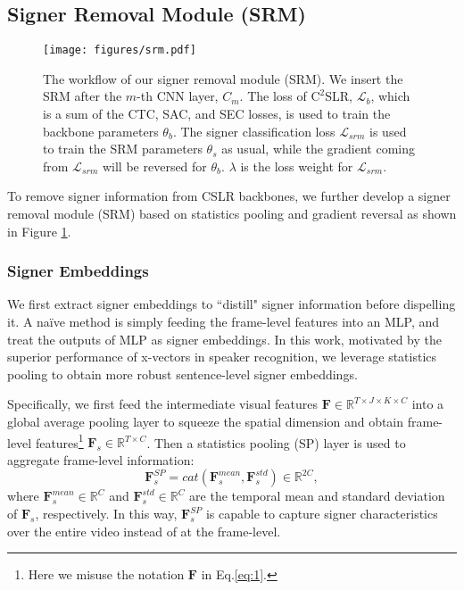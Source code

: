 \documentclass[acmsmall,screen]{acmart}
\def \mbf{\mathbf}
\def \mbb{\mathbb}
\begin{document}
\subsection{Signer Removal Module (SRM)}
\begin{figure}[t]
  \centering
  \texttt{[image: figures/srm.pdf]}
  \caption{The workflow of our signer removal module (SRM). We insert the SRM after the $m$-th CNN layer, $C_m$. The loss of $\text{C}^2$SLR, $\mathcal{L}_b$, which is a sum of the CTC, SAC, and SEC losses, is used to train the backbone parameters $\theta_b$. The signer classification loss $\mathcal{L}_{srm}$ is used to train the SRM parameters $\theta_s$ as usual, while the gradient coming from $\mathcal{L}_{srm}$ will be reversed for $\theta_b$. $\lambda$ is the loss weight for $\mathcal{L}_{srm}$.}
  \label{fig:srm}
\end{figure}
To remove signer information from CSLR backbones, we further develop a signer removal module (SRM) based on statistics pooling and gradient reversal as shown in Figure \ref{fig:srm}. 

\subsubsection{Signer Embeddings}
We first extract signer embeddings to ``distill" signer information before dispelling it.
A na\"ive method is simply feeding the frame-level features into an MLP, and treat the outputs of MLP as signer embeddings.
In this work, motivated by the superior performance of x-vectors \cite{snyder2018x} in speaker recognition, we leverage statistics pooling to obtain more robust sentence-level signer embeddings.

Specifically, we first feed the intermediate visual features $\mbf{F} \in \mbb{R}^{T\times J \times K \times C}$ into a global average pooling layer to squeeze the spatial dimension and obtain frame-level features\footnote{Here we misuse the notation $\mbf{F}$ in Eq.\ref{eq:1}.} $\mbf{F}_s \in \mbb{R}^{T\times C}$. 
Then a statistics pooling (SP) layer is used to aggregate frame-level information:
\begin{equation}
    \mbf{F}_s^{SP} = cat(\mbf{F}_s^{mean}, \mbf{F}_s^{std}) \in \mbb{R}^{2C},
\end{equation}
where $\mbf{F}_s^{mean} \in \mbb{R}^C$ and $\mbf{F}_s^{std} \in \mbb{R}^C$ are the temporal mean and standard deviation of $\mbf{F}_s$, respectively. 
In this way, $\mbf{F}_s^{SP}$ is capable to capture signer characteristics over the entire video instead of at the frame-level.
\end{document}
